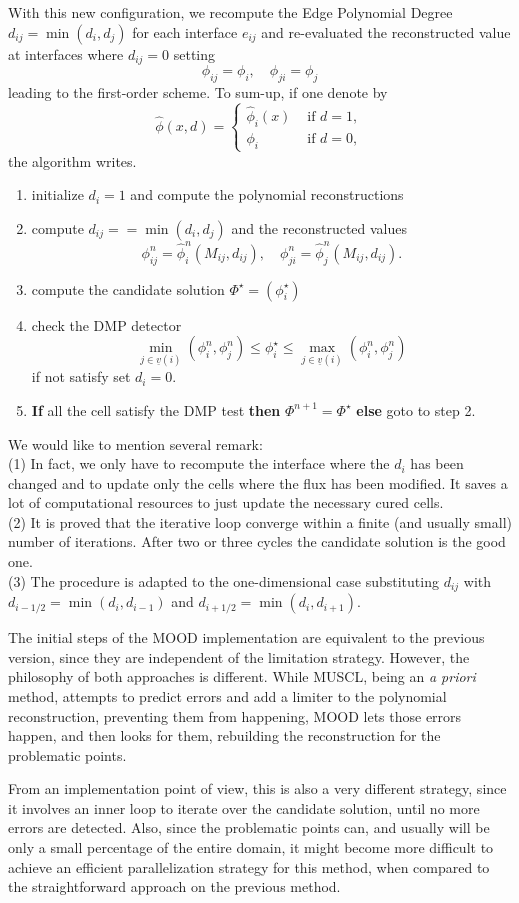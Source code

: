 With this new configuration, we recompute the Edge Polynomial Degree $d_{ij}=\min(d_i,d_j)$
for each interface $e_{ij}$ and re-evaluated the reconstructed value at interfaces where $d_{ij}=0$
setting
$$
\phi_{ij}=\phi_i,\quad \phi_{ji}=\phi_j
$$
leading to the first-order scheme. To sum-up, if one denote by 
$$
\widehat \phi(x,d)=\left \{ 
\begin{array}{ll}
\widehat \phi_i(x) &\text{ if } d=1,\\
\phi_i &\text{ if } d=0,
\end{array}
\right .
$$
the algorithm writes.
\begin{enumerate}
\item initialize $d_i=1$ and compute the polynomial reconstructions
\item compute $d_{ij}==\min(d_i,d_j)$ and the reconstructed values
$$
\phi_{ij}^n=\widehat \phi^n_i(M_{ij},d_{ij}),\quad \phi_{ji}^n=\widehat \phi^n_j(M_{ij},d_{ij}).
$$
\item compute the candidate solution $\Phi^\star=(\phi^\star_i)$
\item check the DMP detector
$$ \min_{j \in \underline{v}(i)}(\phi_i^{n}, \phi^n_j) \leq \phi_i^{\star} \leq 
\max_{j \in \underline{v}(i)}(\phi_i^{n}, \phi^n_j) 
$$
if not satisfy set $d_i=0$.
\item {\bf If} all the cell satisfy the DMP test {\bf then} $\Phi^{n+1}=\Phi^\star$ {\bf else} goto to step 2.
\end{enumerate} 
We would like to mention several remark:\\
(1) In fact, we only have to recompute the interface where the $d_i$ has been changed and 
to update only the cells where the flux has been modified. It saves a lot of computational resources
to just update the necessary cured cells.\\
(2) It is proved that the iterative loop converge within a finite (and usually small) 
number of iterations. After two or three cycles the candidate solution is the good one.\\
(3) The procedure is adapted to the one-dimensional case substituting $d_{ij}$ with
 $d_{i-1/2}=\min(d_i,d_{i-1})$ and $d_{i+1/2}=\min(d_i,d_{i+1})$.


The initial steps of the MOOD implementation are equivalent to the previous version, since they are independent of the limitation strategy. However, the philosophy of both approaches is different. While MUSCL, being an \textit{a priori} method, attempts to predict errors and add a limiter to the polynomial reconstruction, preventing them from happening, MOOD lets those errors happen, and then looks for them, rebuilding the reconstruction for the problematic points.

From an implementation point of view, this is also a very different strategy, since it involves an inner loop to iterate over the candidate solution, until no more errors are detected. Also, since the problematic points can, and usually will be only a small percentage of the entire domain, it might become more difficult to achieve an efficient parallelization strategy for this method, when compared to the straightforward approach on the previous method.